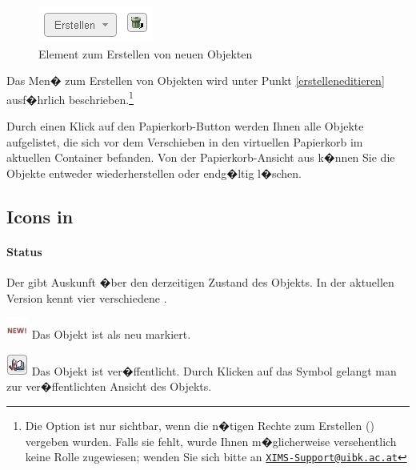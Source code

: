\begin{figure}[!ht]
  \centering
  \includegraphics[scale=0.7]{./images/button-create.png}
  \caption{Element zum Erstellen von neuen Objekten}
  \label{fig:erstellenbutton}
\end{figure}

Das Men� zum Erstellen von Objekten wird unter Punkt \ref{erstelleneditieren} ausf�hrlich
beschrieben.\footnote{Die Option ist nur sichtbar, wenn die n�tigen
  Rechte zum Erstellen () vergeben
  wurden. Falls sie fehlt, wurde Ihnen m�glicherweise versehentlich
  keine Rolle zugewiesen; wenden Sie sich bitte an
  \href{mailto:XIMS-Support@uibk.ac.at}{\nolinkurl{XIMS-Support@uibk.ac.at}}}
  
Durch einen Klick auf den Papierkorb-Button werden Ihnen alle Objekte aufgelistet, die sich vor dem Verschieben in den virtuellen Papierkorb im aktuellen Container befanden. Von der Papierkorb-Ansicht aus k�nnen Sie die Objekte entweder wiederherstellen oder endg�ltig l�schen.

\subsection{Icons in }
\label{icons}

\paragraph{Status}

Der  gibt Auskunft �ber den derzeitigen
Zustand des Objekts. In der aktuellen Version kennt 
vier verschiedene .

\includegraphics[scale=0.7]{./images/icons_status_new.jpg}  
  \label{new}Das Objekt ist als neu markiert.
  
\includegraphics[scale=0.7]{./images/icons_status_published.jpg}  
  Das Objekt ist ver�ffentlicht. Durch Klicken auf das Symbol gelangt man
  zur ver�ffentlichten Ansicht des Objekts.
  
